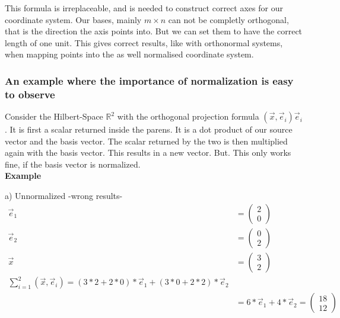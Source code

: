 \documentclass[a4paper]{article}
\begin{document}
This formula is irreplaceable, and is needed to construct correct axes for our coordinate system. Our bases, mainly $m \times n$ can not be completly orthogonal, that is the direction the axis points into. But we can set them to have the correct length of one unit. This gives correct results, like with orthonormal systems, when mapping points into the as well normalised coordinate system.

\subsubsection{An example where the importance of normalization is easy to observe}
\label{why_normalization}

Consider the Hilbert-Space $\mathbb{R}^{2}$ with the orthogonal projection formula $(\vec{x},\vec{e}_{i})\vec{e}_{i}$. It is first a scalar returned inside the parens. It is a dot product of our source vector and the basis vector. The scalar returned by the two is then multiplied again with the basis vector. This results in a new vector. But. This only works fine, if the basis vector is normalized.\\

\textbf{Example}

a) Unnormalized -wrong results-\\

\begin{displaymath}
\begin{align}
\vec{e}_{1} &= \begin{pmatrix}2\\0\end{pmatrix}\\
\vec{e}_{2} &= \begin{pmatrix}0\\2\end{pmatrix}\\
\vec{x} &= \begin{pmatrix}3\\2\end{pmatrix}\\
\sum_{i=1}^{2}(\vec{x},\vec{e}_i) = (3*2+2*0)*\vec{e}_{1} + (3*0+2*2)*\vec{e}_{2}\\ 
&= 6*\vec{e}_{1} + 4*\vec{e}_{2} = \begin{pmatrix}18\\12\end{pmatrix}\\
\end{align}
\end{displaymath}
\end{document}
